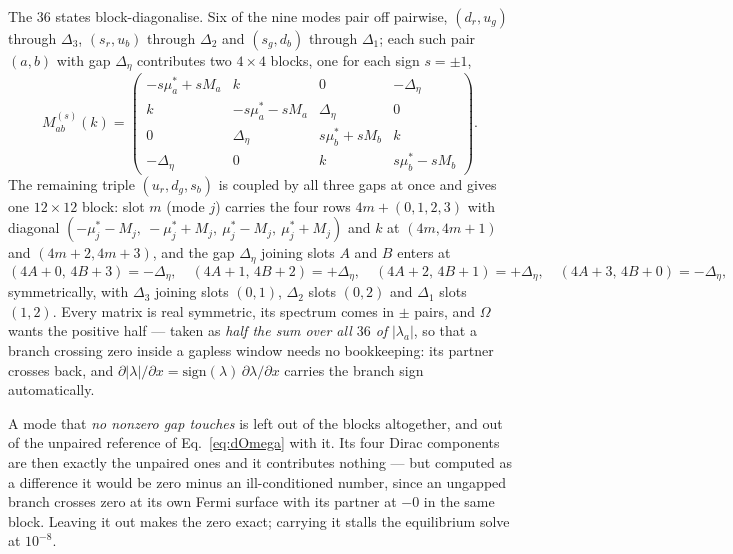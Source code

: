 \documentclass[aps,prc,onecolumn,superscriptaddress,nofootinbib,10pt]{revtex4-2}
\begin{document}
The $36$ states block-diagonalise. Six of the nine modes pair off pairwise,
$(d_r,u_g)$ through $\Delta_3$, $(s_r,u_b)$ through $\Delta_2$ and
$(s_g,d_b)$ through $\Delta_1$; each such pair $(a,b)$ with gap $\Delta_\eta$
contributes two $4\times4$ blocks, one for each sign $s = \pm1$,
\begin{equation}
  M^{(s)}_{ab}(k) = \begin{pmatrix}
    -s\mu^{*}_a + sM_a & k & 0 & -\Delta_\eta \\
    k & -s\mu^{*}_a - sM_a & \Delta_\eta & 0 \\
    0 & \Delta_\eta & s\mu^{*}_b + sM_b & k \\
    -\Delta_\eta & 0 & k & s\mu^{*}_b - sM_b
  \end{pmatrix} .
  \label{eq:block4}
\end{equation}
The remaining triple $(u_r, d_g, s_b)$ is coupled by all three gaps at once
and gives one $12\times12$ block: slot $m$ (mode $j$) carries the four rows
$4m + (0,1,2,3)$ with diagonal
$(-\mu^{*}_j - M_j,\ -\mu^{*}_j + M_j,\ \mu^{*}_j - M_j,\ \mu^{*}_j + M_j)$
and $k$ at $(4m,4m{+}1)$ and $(4m{+}2,4m{+}3)$, and the gap $\Delta_\eta$
joining slots $A$ and $B$ enters at
\begin{equation}
  (4A{+}0,\,4B{+}3) = -\Delta_\eta, \quad
  (4A{+}1,\,4B{+}2) = +\Delta_\eta, \quad
  (4A{+}2,\,4B{+}1) = +\Delta_\eta, \quad
  (4A{+}3,\,4B{+}0) = -\Delta_\eta ,
  \label{eq:block12}
\end{equation}
symmetrically, with $\Delta_3$ joining slots $(0,1)$, $\Delta_2$ slots $(0,2)$
and $\Delta_1$ slots $(1,2)$. Every matrix is real symmetric, its spectrum
comes in $\pm$ pairs, and $\Omega$ wants the positive half --- taken as
\emph{half the sum over all $36$ of} $|\lambda_a|$, so that a branch crossing
zero inside a gapless window needs no bookkeeping: its partner crosses back,
and $\partial|\lambda|/\partial x = \mathrm{sign}(\lambda)\,
\partial\lambda/\partial x$ carries the branch sign automatically.

A mode that \emph{no nonzero gap touches} is left out of the blocks
altogether, and out of the unpaired reference of Eq.~\eqref{eq:dOmega} with
it. Its four Dirac components are then exactly the unpaired ones and it
contributes nothing --- but computed as a difference it would be zero minus an
ill-conditioned number, since an ungapped branch crosses zero at its own Fermi
surface with its partner at $-0$ in the same block. Leaving it out makes the
zero exact; carrying it stalls the equilibrium solve at $10^{-8}$.
\end{document}
